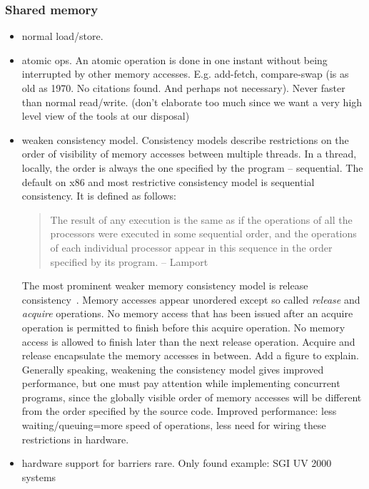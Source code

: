 \documentclass[a4paper, 10pt]{article}
\begin{document}
\subsubsection{Shared memory}
\label{sssec:existing-means-shared}
\begin{itemize}
	\item normal load/store.
	\item atomic ops. An atomic operation is done in one instant without being interrupted by other memory accesses. E.g. add-fetch, compare-swap (is as old as 1970. No citations found. And perhaps not necessary). Never faster than normal read/write. (don't elaborate too much since we want a very high level view of the tools at our disposal)
	\item weaken consistency model. Consistency models describe restrictions on the order of visibility of memory accesses between multiple threads. In a thread, locally, the order is always the one specified by the program -- sequential. The default on x86 and most restrictive consistency model is sequential consistency. It is defined as follows:
		\begin{quote}
			The result of any execution is the same as if the operations of all the processors were executed in some sequential order, and the operations of each individual processor appear in this sequence in the order specified by its program. -- Lamport~\cite{sequentialconsistency}
		\end{quote}
		The most prominent weaker memory consistency model is release consistency~\cite{gha90}. Memory accesses appear unordered except so called \emph{release} and \emph{acquire} operations. No memory access that has been issued after an acquire operation is permitted to finish before this acquire operation. No memory access is allowed to finish later than the next release operation. Acquire and release encapsulate the memory accesses in between. Add a figure to explain. Generally speaking, weakening the consistency model gives improved performance, but one must pay attention while implementing concurrent programs, since the globally visible order of memory accesses will be different from the order specified by the source code. Improved performance: less waiting/queuing=more speed of operations, less need for wiring these restrictions in hardware.
	\item hardware support for barriers rare. Only found example: SGI UV 2000 systems\cite{sgiuv2000}
\end{itemize}
\end{document}
